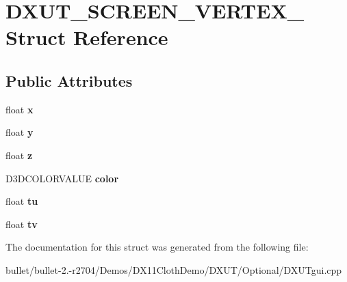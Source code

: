 \hypertarget{struct_d_x_u_t___s_c_r_e_e_n___v_e_r_t_e_x__10}{\section{D\+X\+U\+T\+\_\+\+S\+C\+R\+E\+E\+N\+\_\+\+V\+E\+R\+T\+E\+X\+\_ Struct Reference}
\label{struct_d_x_u_t___s_c_r_e_e_n___v_e_r_t_e_x__10}
}
\subsection*{Public Attributes}
\begin{DoxyCompactItemize}
\item 
\hypertarget{struct_d_x_u_t___s_c_r_e_e_n___v_e_r_t_e_x__10_a14ebf39086c6ac486c9e98bea4a6f1bf}{float {\bfseries x}}\label{struct_d_x_u_t___s_c_r_e_e_n___v_e_r_t_e_x__10_a14ebf39086c6ac486c9e98bea4a6f1bf}

\item 
\hypertarget{struct_d_x_u_t___s_c_r_e_e_n___v_e_r_t_e_x__10_a7c81d4f2b907d56b85b4358f0a9e5407}{float {\bfseries y}}\label{struct_d_x_u_t___s_c_r_e_e_n___v_e_r_t_e_x__10_a7c81d4f2b907d56b85b4358f0a9e5407}

\item 
\hypertarget{struct_d_x_u_t___s_c_r_e_e_n___v_e_r_t_e_x__10_a54c09a0edc9f6e86c396433c2d024edc}{float {\bfseries z}}\label{struct_d_x_u_t___s_c_r_e_e_n___v_e_r_t_e_x__10_a54c09a0edc9f6e86c396433c2d024edc}

\item 
\hypertarget{struct_d_x_u_t___s_c_r_e_e_n___v_e_r_t_e_x__10_a46311310bd2f81289c813085c268a109}{D3\+D\+C\+O\+L\+O\+R\+V\+A\+L\+U\+E {\bfseries color}}\label{struct_d_x_u_t___s_c_r_e_e_n___v_e_r_t_e_x__10_a46311310bd2f81289c813085c268a109}

\item 
\hypertarget{struct_d_x_u_t___s_c_r_e_e_n___v_e_r_t_e_x__10_ad27d707459e0c8ea7b7f5b7e1ae16c9a}{float {\bfseries tu}}\label{struct_d_x_u_t___s_c_r_e_e_n___v_e_r_t_e_x__10_ad27d707459e0c8ea7b7f5b7e1ae16c9a}

\item 
\hypertarget{struct_d_x_u_t___s_c_r_e_e_n___v_e_r_t_e_x__10_a24ee7c3084e101f5cb22e72faad1f71d}{float {\bfseries tv}}\label{struct_d_x_u_t___s_c_r_e_e_n___v_e_r_t_e_x__10_a24ee7c3084e101f5cb22e72faad1f71d}

\end{DoxyCompactItemize}


The documentation for this struct was generated from the following file\+:\begin{DoxyCompactItemize}
\item 
bullet/bullet-\/2.-\/r2704/\+Demos/\+D\+X11\+Cloth\+Demo/\+D\+X\+U\+T/\+Optional/D\+X\+U\+Tgui.\+cpp\end{DoxyCompactItemize}
